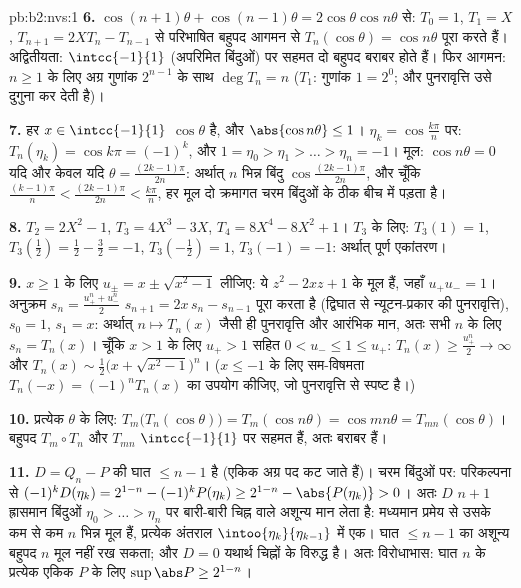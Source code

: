 \begin{solution}{pb:b2:nvs:1}
\textbf{6.} $\cos(n{+}1)\theta + \cos(n{-}1)\theta =
2\cos\theta\cos n\theta$ से: $T_0 = 1$, $T_1 = X$, $T_{n+1} = 2XT_n - T_{n-1}$ से परिभाषित बहुपद आगमन से $T_n(\cos\theta)
= \cos n\theta$ पूरा
करते हैं। अद्वितीयता: $\intcc{-1}{1}$ (अपरिमित बिंदुओं) पर सहमत दो बहुपद बराबर होते
हैं। फिर आगमन: $n \geq 1$ के लिए अग्र गुणांक $2^{n-1}$ के साथ $\deg T_n = n$ ($T_1$: गुणांक $1 = 2^0$;
और पुनरावृत्ति उसे दुगुना कर देती है)।

\textbf{7.} हर $x \in \intcc{-1}{1}$ $\cos\theta$ है, और $\abs{\cos n\theta} \leq 1$। $\eta_k = \cos\frac{k\pi}n$ पर: $T_n(\eta_k) = \cos k\pi = (-1)^k$, और $1 = \eta_0 > \eta_1 >
\dots > \eta_n = -1$। मूल: $\cos n\theta = 0$ यदि
और केवल यदि $\theta =
\frac{(2k-1)\pi}{2n}$: अर्थात् $n$ भिन्न बिंदु $\cos\frac{(2k-1)\pi}{2n}$, और चूँकि $\frac{(k-1)\pi}n <
\frac{(2k-1)\pi}{2n} < \frac{k\pi}n$, हर मूल दो
क्रमागत चरम बिंदुओं के ठीक बीच में पड़ता है।

\textbf{8.} $T_2 = 2X^2 - 1$, $T_3 = 4X^3 - 3X$, $T_4 = 8X^4 -
8X^2 + 1$। $T_3$ के लिए: $T_3(1) = 1$, $T_3(\tfrac12) = \tfrac12 -
\tfrac32 = -1$, $T_3(-\tfrac12) = 1$, $T_3(-1) = -1$: अर्थात्
पूर्ण एकांतरण।

\textbf{9.} $x \geq 1$ के लिए $u_\pm = x \pm \sqrt{x^2 - 1}$ लीजिए: ये $z^2 - 2xz + 1$ के मूल हैं, जहाँ $u_+u_- = 1$। अनुक्रम
$s_n = \frac{u_+^n + u_-^n}2$ $s_{n+1} = 2x\,s_n -
s_{n-1}$ पूरा करता है (द्विघात से न्यूटन-प्रकार की पुनरावृत्ति), $s_0 = 1$,
$s_1 = x$: अर्थात् $n \mapsto
T_n(x)$ जैसी ही पुनरावृत्ति और आरंभिक मान, अतः सभी $n$ के लिए
$s_n = T_n(x)$। चूँकि $x > 1$ के लिए $u_+ > 1$ सहित $0 < u_- \leq 1
\leq u_+$: $T_n(x) \geq
\frac{u_+^n}2 \to \infty$ और $T_n(x) \sim \frac12\bigl(x +
\sqrt{x^2-1}\bigr)^n$। ($x \leq -1$ के लिए
सम-विषमता $T_n(-x)
= (-1)^nT_n(x)$ का उपयोग कीजिए, जो पुनरावृत्ति से स्पष्ट है।)

\textbf{10.} प्रत्येक $\theta$ के लिए: $T_m\bigl(T_n(\cos\theta)\bigr)
= T_m(\cos n\theta) = \cos mn\theta =
T_{mn}(\cos\theta)$। बहुपद $T_m \circ T_n$ और $T_{mn}$ $\intcc{-1}{1}$ पर सहमत
हैं, अतः बराबर हैं।

\textbf{11.} $D = Q_n - P$ की घात $\leq n - 1$ है (एकिक अग्र पद कट जाते हैं)। चरम बिंदुओं
पर: परिकल्पना से $(-1)^kD(\eta_k) =
2^{1-n} - (-1)^kP(\eta_k) \geq 2^{1-n} - \abs{P(\eta_k)} > 0$। अतः $D$ $n + 1$ ह्रासमान बिंदुओं $\eta_0 > \dots > \eta_n$ पर बारी-बारी
चिह्न वाले अशून्य मान लेता है: मध्यमान प्रमेय से उसके कम से कम $n$
भिन्न मूल हैं, प्रत्येक  अंतराल $\intoo{\eta_{k}}{\eta_{k-1}}$ में एक। घात $\leq n - 1$ का अशून्य बहुपद
$n$ मूल नहीं रख सकता; और $D = 0$ यथार्थ चिह्नों के विरुद्ध है। अतः
विरोधाभास: घात $n$ के प्रत्येक एकिक $P$ के लिए $\sup\abs P \geq 2^{1-n}$।


\end{solution}
